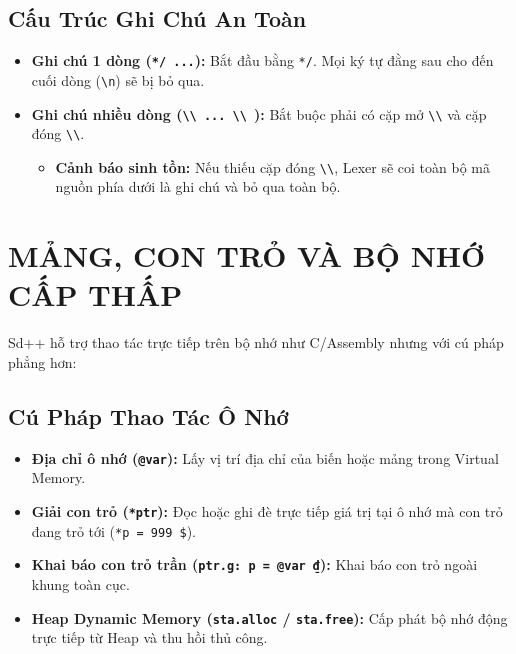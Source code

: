 \documentclass[11pt, a4paper]{article}
\begin{document}
\subsection{Cấu Trúc Ghi Chú An Toàn}
\begin{itemize}
    \item \textbf{Ghi chú 1 dòng (\texttt{*/ ...}):} Bắt đầu bằng \texttt{*/}. Mọi ký tự đằng sau cho đến cuối dòng (\texttt{\textbackslash n}) sẽ bị bỏ qua.
    \item \textbf{Ghi chú nhiều dòng (\texttt{\textbackslash\textbackslash{} ... \textbackslash\textbackslash{} }):} Bắt buộc phải có cặp mở \texttt{\textbackslash\textbackslash{}} và cặp đóng \texttt{\textbackslash\textbackslash{}}.
    \begin{itemize}
        \item \textbf{Cảnh báo sinh tồn:} Nếu thiếu cặp đóng \texttt{\textbackslash\textbackslash{}}, Lexer sẽ coi toàn bộ mã nguồn phía dưới là ghi chú và bỏ qua toàn bộ.
    \end{itemize}
\end{itemize}

\section{MẢNG, CON TRỎ VÀ BỘ NHỚ CẤP THẤP}

Sd++ hỗ trợ thao tác trực tiếp trên bộ nhớ như C/Assembly nhưng với cú pháp phẳng hơn:

\subsection{Cú Pháp Thao Tác Ô Nhớ}
\begin{itemize}
    \item \textbf{Địa chỉ ô nhớ (\texttt{@var}):} Lấy vị trí địa chỉ của biến hoặc mảng trong Virtual Memory.
    \item \textbf{Giải con trỏ (\texttt{*ptr}):} Đọc hoặc ghi đè trực tiếp giá trị tại ô nhớ mà con trỏ đang trỏ tới (\texttt{*p = 999 \$}).
    \item \textbf{Khai báo con trỏ trần (\texttt{ptr.g: p = @var ₫}):} Khai báo con trỏ ngoài khung toàn cục.
    \item \textbf{Heap Dynamic Memory (\texttt{sta.alloc} / \texttt{sta.free}):} Cấp phát bộ nhớ động trực tiếp từ Heap và thu hồi thủ công.
\end{itemize}
\end{document}
